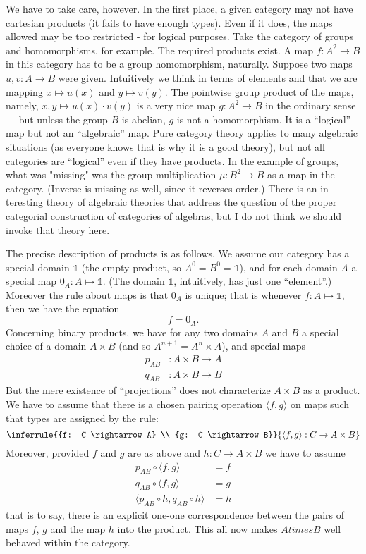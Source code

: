 \documentclass[12pt]{article}
\def\to{\rightarrow}
\def\comp{\circ}
\def\bbone{\mathbb 1}
\def\zeromap{0}
\begin{document}
We have to take care, however. In the first place, a given category may not have cartesian products (it fails to have enough types). Even if it does, the maps allowed may be too restricted - for logical purposes. Take the category of groups and homomorphisms, for example. The required products exist.
A map $f : A^2 \to B$ in this category has to be a group homomor­phism, naturally. Suppose two maps $u,v: A \to B$ were given.
Intuitively we think in terms of elements and that we are map­ping $x \mapsto u(x)$ and $y \mapsto v(y)$. The pointwise group product of the maps, namely, $x,y \mapsto  u(x) \cdot v(y)$ is a very nice map $g : A^2 \to B$ in the ordinary sense --- but unless the group $B$ is abelian, $g$ is not a homomorphism. It is a ``logical'' map but not an ``algebra­ic'' map. Pure category theory applies to many algebraic situa­tions (as everyone knows that is why it is a good theory), but not all categories are ``logical'' even if they have products. In the example of groups, what was "missing" was the group
multiplication $\mu: B^2 \to B$ as a map in the category. (Inverse is missing as well, since it reverses order.) There is an in­teresting theory of algebraic theories that address the ques­tion of the proper categorial construction of categories of al­gebras, but I do not think we should invoke that theory here.

The precise description of products is as follows. We as­sume our category has a special domain $\bbone$ (the empty product, so $A^0 = B^0 = {\bbone}$), and for each domain $A$ a special map $\zeromap_A: A \mapsto \bbone$. (The domain $\bbone$, intuitively, has just one ``element''.)  Moreover the rule about maps is that $\zeromap_A$ is unique; that is whenever $f : A \mapsto \bbone$, then we have the equation
$$f = \zeromap_A .$$
%
Concerning binary products, we have for any two domains $A$ and $B$ a special choice of a domain $A \times B$ (and so $A^{n+1} = A^n \times A$), and special maps
\begin{align*}
p_{AB}&: A \times B \to A\\
q_{AB}&: A \times B \to B
\end{align*}
%
But the mere existence of ``projections'' does not characterize $A \times B$ as a product. We have to assume that there is a chosen pairing operation $\langle f,g \rangle$ on maps such that types are assigned by the rule:
%
$$
\inferrule
  {{f: C \to A} \\ {g: C \to B}}
  {\langle f,g \rangle: C \to A \times B}
$$
%
Moreover, provided $f$ and $g$ are as above and $h: C \to A \times B $ we have to assume
\begin{align*}
p_{AB} \comp \langle f,g \rangle &= f\\
q_{AB} \comp \langle f,g \rangle &= g\\
\langle p_{AB}\comp h, q_{AB}\comp h\rangle &= h
\end{align*}
%
that is to say, there is an explicit one-one correspondence between the pairs of maps $f$, $g$ and the map $h$ into the product. This all now makes $A times B$ well behaved within the category.
\end{document}
